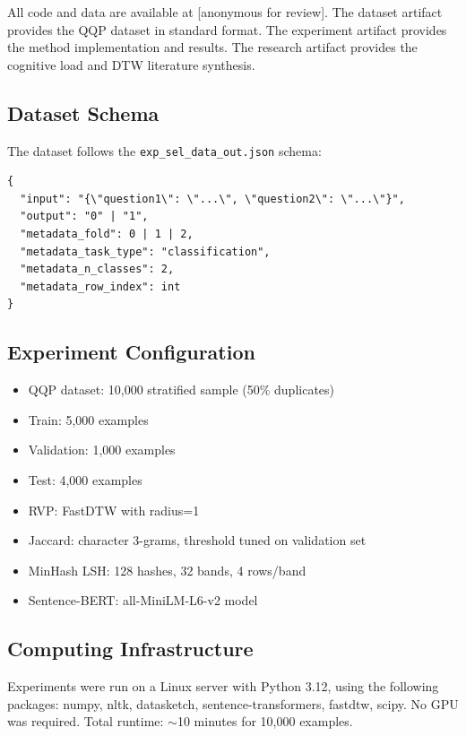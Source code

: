 \documentclass[11pt,letterpaper]{article}
\begin{document}
All code and data are available at [anonymous for review]. The dataset artifact provides the QQP dataset in standard format. The experiment artifact provides the method implementation and results. The research artifact provides the cognitive load and DTW literature synthesis.

\subsection{Dataset Schema}

The dataset follows the \texttt{exp\_sel\_data\_out.json} schema:
\begin{verbatim}
{
  "input": "{\"question1\": \"...\", \"question2\": \"...\"}",
  "output": "0" | "1",
  "metadata_fold": 0 | 1 | 2,
  "metadata_task_type": "classification",
  "metadata_n_classes": 2,
  "metadata_row_index": int
}
\end{verbatim}

\subsection{Experiment Configuration}

\begin{itemize}
\item QQP dataset: 10,000 stratified sample (50\% duplicates)
\item Train: 5,000 examples
\item Validation: 1,000 examples
\item Test: 4,000 examples
\item RVP: FastDTW with radius=1
\item Jaccard: character 3-grams, threshold tuned on validation set
\item MinHash LSH: 128 hashes, 32 bands, 4 rows/band
\item Sentence-BERT: all-MiniLM-L6-v2 model
\end{itemize}

\subsection{Computing Infrastructure}

Experiments were run on a Linux server with Python 3.12, using the following packages: numpy, nltk, datasketch, sentence-transformers, fastdtw, scipy. No GPU was required. Total runtime: $\sim$10 minutes for 10,000 examples.
\end{document}

